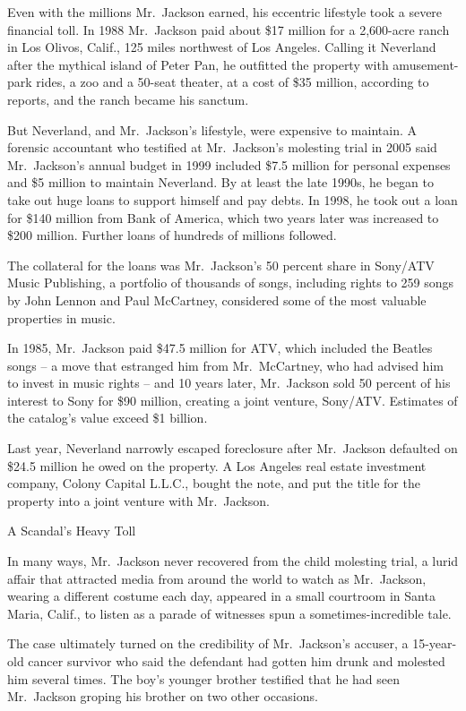 ﻿\documentclass[12pt]{article}
\begin{document}
Even with the millions Mr.~Jackson earned, his eccentric lifestyle took a severe financial toll. In
1988 Mr.~Jackson paid about \$17 million for a 2,600-acre ranch in Los Olivos, Calif., 125 miles
northwest of Los Angeles. Calling it Neverland after the mythical island of Peter Pan, he outfitted
the property with amusement-park rides, a zoo and a 50-seat theater, at a cost of \$35 million,
according to reports, and the ranch became his sanctum.

But Neverland, and Mr.~Jackson's lifestyle, were expensive to maintain. A forensic accountant who
testified at Mr.~Jackson's molesting trial in 2005 said Mr.~Jackson's annual budget in 1999 included
\$7.5 million for personal expenses and \$5 million to maintain Neverland. By at least the late
1990s, he began to take out huge loans to support himself and pay debts. In 1998, he took out a loan
for \$140 million from Bank of America, which two years later was increased to \$200 million.
Further loans of hundreds of millions followed.

The collateral for the loans was Mr.~Jackson's 50 percent share in Sony/ATV Music Publishing, a
portfolio of thousands of songs, including rights to 259 songs by John Lennon and Paul McCartney,
considered some of the most valuable properties in music.

In 1985, Mr.~Jackson paid \$47.5 million for ATV, which included the Beatles songs -- a move that
estranged him from Mr.~McCartney, who had advised him to invest in music rights -- and 10 years
later, Mr.~Jackson sold 50 percent of his interest to Sony for \$90 million, creating a joint
venture, Sony/ATV. Estimates of the catalog's value exceed \$1 billion.

Last year, Neverland narrowly escaped foreclosure after Mr.~Jackson defaulted on \$24.5 million he
owed on the property. A Los Angeles real estate investment company, Colony Capital L.L.C., bought
the note, and put the title for the property into a joint venture with Mr.~Jackson.

A Scandal's Heavy Toll

In many ways, Mr.~Jackson never recovered from the child molesting trial, a lurid affair that
attracted media from around the world to watch as Mr.~Jackson, wearing a different costume each day,
appeared in a small courtroom in Santa Maria, Calif., to listen as a parade of witnesses spun a
sometimes-incredible tale.

The case ultimately turned on the credibility of Mr.~Jackson's accuser, a 15-year-old cancer
survivor who said the defendant had gotten him drunk and molested him several times. The boy's
younger brother testified that he had seen Mr.~Jackson groping his brother on two other occasions.
\end{document}
